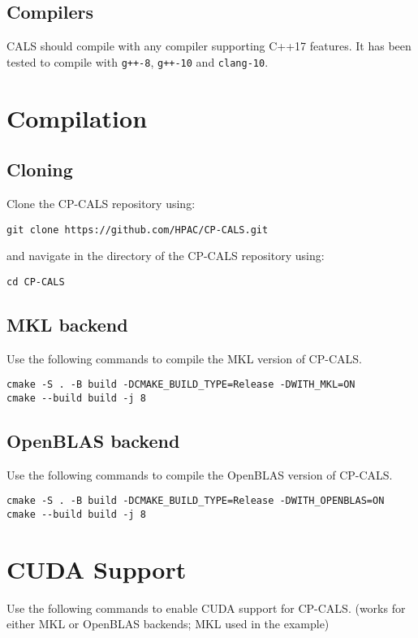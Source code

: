 \documentclass[preprint]{acmart}
\newcommand{\hlgtexttt}[1]{\texttt{\colorbox{lightgray!15}{#1}}}
\newcommand{\code}[1]{\hlgtexttt{#1}}
\begin{document}
\subsection{Compilers}
CALS should compile with any compiler supporting C++17 features. It has been tested to compile with \code{g++-8}, \code{g++-10} and \code{clang-10}.

\section{Compilation}

\subsection{Cloning}
Clone the CP-CALS repository using:

\begin{lstlisting}
git clone https://github.com/HPAC/CP-CALS.git
\end{lstlisting}

\noindent and navigate in the directory of the CP-CALS repository using:

\begin{lstlisting}
cd CP-CALS
\end{lstlisting}

\subsection{MKL backend}
\noindent Use the following commands to compile the MKL version of CP-CALS.

\begin{lstlisting}
cmake -S . -B build -DCMAKE_BUILD_TYPE=Release -DWITH_MKL=ON
cmake --build build -j 8
\end{lstlisting}

\subsection{OpenBLAS backend}
\noindent Use the following commands to compile the OpenBLAS version of CP-CALS.

\begin{lstlisting}
cmake -S . -B build -DCMAKE_BUILD_TYPE=Release -DWITH_OPENBLAS=ON
cmake --build build -j 8
\end{lstlisting}

\section{CUDA Support}
\noindent Use the following commands to enable CUDA support for CP-CALS. (works for either MKL or OpenBLAS backends; MKL used in the example)
\end{document}
